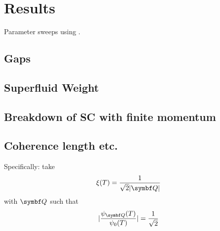 \documentclass[../notes.tex]{subfiles}
\begin{document}
	
\chapter{Results}

Parameter sweeps using \cite{bachParasweepTemplatebasedUtility2021}.

\section{Gaps}

\section{Superfluid Weight}

\section{Breakdown of SC with finite momentum}

\section{Coherence length etc.}


Specifically: take
\begin{equation}
	\xi(T) = \frac{1}{\sqrt{2} \vert \vb{Q} \vert}
\end{equation}
with \(\vb{Q}\) such that
\begin{equation}
	\vert \frac{\psi_{\vb{Q}}(T)}{\psi_0 (T)} \vert = \frac{1}{\sqrt{2}}
\end{equation}



	
\end{document}

